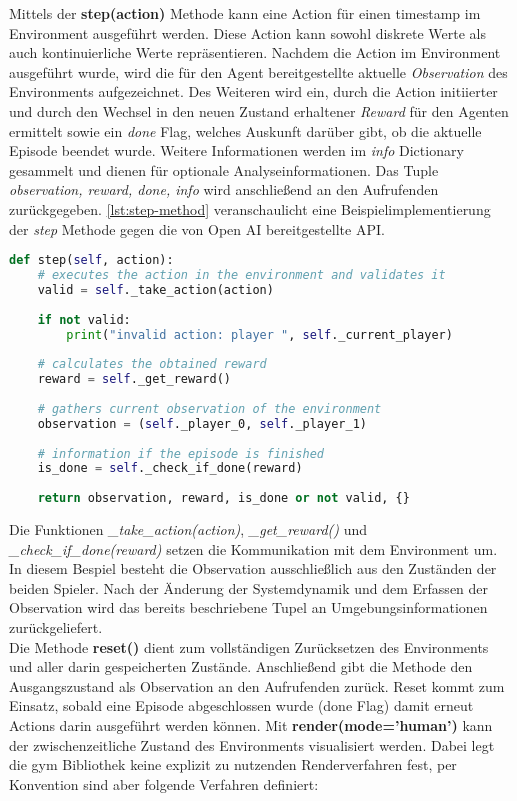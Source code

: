 \documentclass[11pt]{scrartcl}
\begin{document}
Mittels der \textbf{step(action)} Methode kann eine Action für einen timestamp im
Environment ausgeführt werden. Diese Action kann sowohl diskrete Werte als auch 
kontinuierliche Werte repräsentieren. Nachdem die Action im Environment ausgeführt wurde,
wird die für den Agent bereitgestellte aktuelle \textit{Observation} des Environments
aufgezeichnet. Des Weiteren wird ein, durch die Action initiierter und durch den Wechsel
in den neuen Zustand erhaltener \textit{Reward} für den Agenten ermittelt sowie ein 
\textit{done} Flag, welches Auskunft darüber gibt, ob die aktuelle Episode beendet wurde.
Weitere Informationen werden im \textit{info} Dictionary gesammelt und dienen für optionale
Analyseinformationen. Das Tuple \textit{observation, reward, done, info} wird anschließend
an den Aufrufenden zurückgegeben. \autoref{lst:step-method} veranschaulicht eine
Beispielimplementierung der \textit{step} Methode gegen die von Open AI bereitgestellte API.

\begin{lstlisting}[language=Python, caption=step method, label=lst:step-method]
def step(self, action):
	# executes the action in the environment and validates it
	valid = self._take_action(action)
	
	if not valid:
		print("invalid action: player ", self._current_player)
	
	# calculates the obtained reward
	reward = self._get_reward()
	
	# gathers current observation of the environment
	observation = (self._player_0, self._player_1)
	
	# information if the episode is finished
	is_done = self._check_if_done(reward)
    
	return observation, reward, is_done or not valid, {}
\end{lstlisting}
\noindent
Die Funktionen \textit{\_take\_action(action)}, \textit{\_get\_reward()} und
\textit{\_check\_if\_done(reward)} setzen die Kommunikation mit dem Environment um. In
diesem Bespiel besteht die Observation ausschließlich aus den Zuständen der beiden Spieler.
Nach der Änderung der Systemdynamik und dem Erfassen der Observation wird das bereits
beschriebene Tupel an Umgebungsinformationen zurückgeliefert.\\
Die Methode \textbf{reset()} dient zum vollständigen Zurücksetzen des Environments und aller
darin gespeicherten Zustände. Anschließend gibt die Methode den Ausgangszustand als Observation
an den Aufrufenden zurück. Reset kommt zum Einsatz, sobald eine Episode abgeschlossen wurde
(done Flag) damit erneut Actions darin ausgeführt werden können.
\newline
\noindent
Mit \textbf{render(mode='human')} kann der zwischenzeitliche Zustand des Environments
visualisiert werden. Dabei legt die gym Bibliothek keine explizit zu nutzenden Renderverfahren
fest, per Konvention sind aber folgende Verfahren definiert: 
\end{document}
